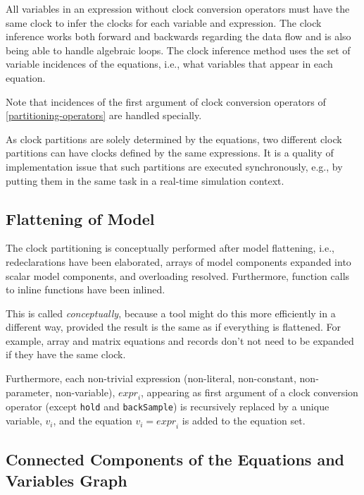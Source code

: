 All variables in an expression without clock conversion operators must have the same clock to infer the clocks for each variable and expression.
The clock inference works both forward and backwards regarding the data flow and is also being able to handle algebraic loops.
The clock inference method uses the set of variable incidences of the equations, i.e., what variables that appear in each equation.

Note that incidences of the first argument of clock conversion operators of \cref{partitioning-operators} are handled specially.

\begin{nonnormative}
As clock partitions are solely determined by the equations, two different clock partitions can have clocks defined by the same expressions.
It is a quality of implementation issue that such partitions are executed synchronously, e.g., by putting them in the same task in a real-time simulation context.
\end{nonnormative}

\subsection{Flattening of Model}\label{flattening-of-model}

The clock partitioning is conceptually performed after model flattening, i.e., redeclarations have been elaborated, arrays of model components expanded into scalar model components, and overloading resolved.
Furthermore, function calls to inline functions have been inlined.

\begin{nonnormative}
This is called \emph{conceptually}, because a tool might do this more efficiently in a different way, provided the result is the same as if everything is flattened.
For example, array and matrix equations and records don't not need to be expanded if they have the same clock.
\end{nonnormative}

Furthermore, each non-trivial expression (non-literal, non-constant, non-parameter, non-variable), $\mathit{expr}_{i}$, appearing as first argument of a clock conversion operator (except \lstinline!hold! and \lstinline!backSample!) is recursively replaced by a unique variable, $v_{i}$, and the equation $v_{i} = \mathit{expr}_{i}$ is added to the equation set.

\subsection{Connected Components of the Equations and Variables Graph}\label{connected-components-of-the-equations-and-variables-graph}

